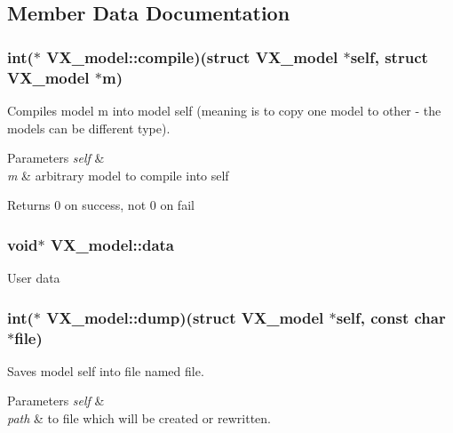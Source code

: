 \subsection{Member Data Documentation}
\hypertarget{structVX__model_affc69898370ac445fb57f55e262b07cb}{
\subsubsection[{compile}]{\setlength{\rightskip}{0pt plus 5cm}int($\ast$ V\-X\-\_\-model\-::compile)(struct {\bf V\-X\-\_\-model} $\ast$self, struct {\bf V\-X\-\_\-model} $\ast$m)}}\label{structVX__model_affc69898370ac445fb57f55e262b07cb}
Compiles model m into model self (meaning is to copy one model to other -\/ the models can be different type). 
\begin{DoxyParams}{Parameters}
{\em self} & \\
\hline
{\em m} & arbitrary model to compile into self \\
\hline
\end{DoxyParams}
\begin{DoxyReturn}{Returns}
0 on success, not 0 on fail 
\end{DoxyReturn}
\hypertarget{structVX__model_a6caa79e92123cf10b93b19201849a024}{
\subsubsection[{data}]{\setlength{\rightskip}{0pt plus 5cm}void$\ast$ V\-X\-\_\-model\-::data}}\label{structVX__model_a6caa79e92123cf10b93b19201849a024}
User data \hypertarget{structVX__model_a79f230b8c7c5c863f047d9465e662a56}{
\subsubsection[{dump}]{\setlength{\rightskip}{0pt plus 5cm}int($\ast$ V\-X\-\_\-model\-::dump)(struct {\bf V\-X\-\_\-model} $\ast$self, const char $\ast$file)}}\label{structVX__model_a79f230b8c7c5c863f047d9465e662a56}
Saves model self into file named file. 
\begin{DoxyParams}{Parameters}
{\em self} & \\
\hline
{\em path} & to file which will be created or rewritten. \\
\hline
\end{DoxyParams}
